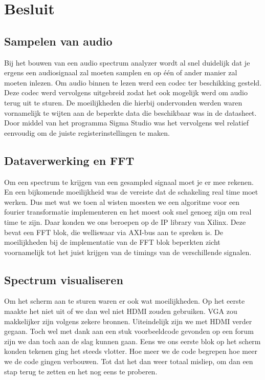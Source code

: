 \chapter{Besluit}
	\section{Sampelen van audio}
		\par Bij het bouwen van een audio spectrum analyzer wordt al snel duidelijk dat je ergens een audiosignaal zal moeten samplen en op \'e\'en of ander manier zal moeten inlezen. Om audio binnen te lezen werd een codec ter beschikking gesteld. Deze codec werd vervolgens uitgebreid zodat het ook mogelijk werd om audio terug uit te sturen. De moeilijkheden die hierbij ondervonden werden waren vornamelijk te wijten aan de beperkte data die beschikbaar was in de datasheet. Door middel van het programma Sigma Studio was het vervolgens wel relatief eenvoudig om de juiste registerinstellingen te maken.

	\section{Dataverwerking en FFT}
		\par Om een spectrum te krijgen van een gesampled signaal moet je er mee rekenen. En een bijkomende moeilijkheid was de vereiste dat de schakeling real time moet werken. Dus met wat we toen al wisten moesten we een algoritme voor een fourier transformatie implementeren en het moest ook snel genoeg zijn om real time te zijn. Daar konden we ons beroepen op de IP library van Xilinx. Deze bevat een FFT blok, die welliswaar via AXI-bus aan te spreken is. De moeilijkheden bij de implementatie van de FFT blok beperkten zicht voornamelijk tot het juist krijgen van de timings van de verschillende signalen.

	\section{Spectrum visualiseren}
		\par Om het scherm aan te sturen waren er ook wat moeilijkheden. Op het eerste maakte het niet uit of we dan wel niet HDMI zouden gebruiken. VGA zou makkelijker zijn volgens zekere bronnen. Uiteindelijk zijn we met HDMI verder gegaan. Toch wel met dank aan een stuk voorbeeldcode gevonden op een forum zijn we dan toch aan de slag kunnen gaan. Eens we ons eerste blok op het scherm konden tekenen ging het steeds vlotter. Hoe meer we de code begrepen hoe meer we de code gingen verbouwen. Tot dat het dan weer totaal misliep, om dan een stap terug te zetten en het nog eens te proberen. 

